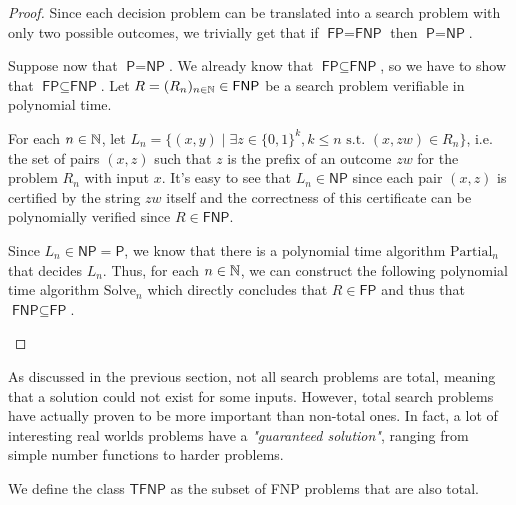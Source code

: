 \begin{proof}
    Since each decision problem can be translated into a search problem with only two possible outcomes, we trivially get that if $\textsf{FP} = \textsf{FNP}$ then $\textsf{P} = \textsf{NP}$.
    
    Suppose now that $\textsf{P} = \textsf{NP}$. We already know that $\textsf{FP} \subseteq \textsf{FNP}$, so we have to show that $\textsf{FP} \subseteq \textsf{FNP}$. Let $R = (R_n)_{n \in \mathbb{N}} \in \textsf{FNP}$ be a search problem verifiable in polynomial time.
    
    For each $n \in \mathbb{N}$, let $L_n = \{(x,y) \mid \exists z \in \{0,1\}^{k}, k \leq n \text{ s.t. } (x,zw) \in R_n\}$, i.e. the set of pairs $(x,z)$ such that $z$ is the prefix of an outcome $zw$ for the problem $R_n$ with input $x$. It's easy to see that $L_n \in \textsf{NP}$ since each pair $(x,z)$ is certified by the string $zw$ itself and the correctness of this certificate can be polynomially verified since $R \in \textsf{FNP}$.
    
    Since $L_n \in \textsf{NP} = \textsf{P}$, we know that there is a polynomial time algorithm $\mathrm{Partial}_n$ that decides $L_n$. Thus, for each $n \in \mathbb{N}$, we can construct the following polynomial time algorithm $\mathrm{Solve}_n$ which directly concludes that $R \in \textsf{FP}$ and thus that $\textsf{FNP} \subseteq \textsf{FP}$.

    \begin{algorithmic}
                \Else
                \EndIf
            \EndWhile
        \EndFunction
    \end{algorithmic}
\end{proof}

As discussed in the previous section, not all search problems are total, meaning that a solution could not exist for some inputs. However, total search problems have actually proven to be more important than non-total ones. In fact, a lot of interesting real worlds problems have a \textit{"guaranteed solution"}, ranging from simple number functions to harder problems.

\begin{definition}
    We define the class $\mathsf{TFNP}$ as the subset of \textsf{FNP} problems that are also total.
\end{definition}

